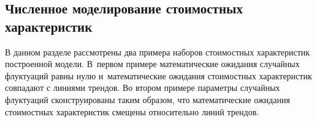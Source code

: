 \begin{multicols}{2}
\section{Численное моделирование стоимостных характеристик}

В данном разделе рассмотрены два примера наборов стоимостных характеристик 
построенной модели. В~первом примере математические ожидания случайных 
флуктуаций равны нулю и~математические ожидания стоимостных характеристик 
совпадают с линиями трендов. Во втором примере параметры случайных флуктуаций 
сконструированы таким образом, что математические ожидания стоимостных 
характеристик смещены относительно линий трендов.

\begin{figure*} %
 \vspace*{1pt}
\begin{center}
   \mbox{%
\epsfxsize=161.435mm 
}
\end{center}
\vspace*{-9pt}
\end{figure*}

\begin{figure*}[b] %
 \vspace*{1pt}
\begin{center}
   \mbox{%
\epsfxsize=163mm 
}
\end{center}
\vspace*{-9pt}
\end{figure*}

\smallskip


\end{multicols}
